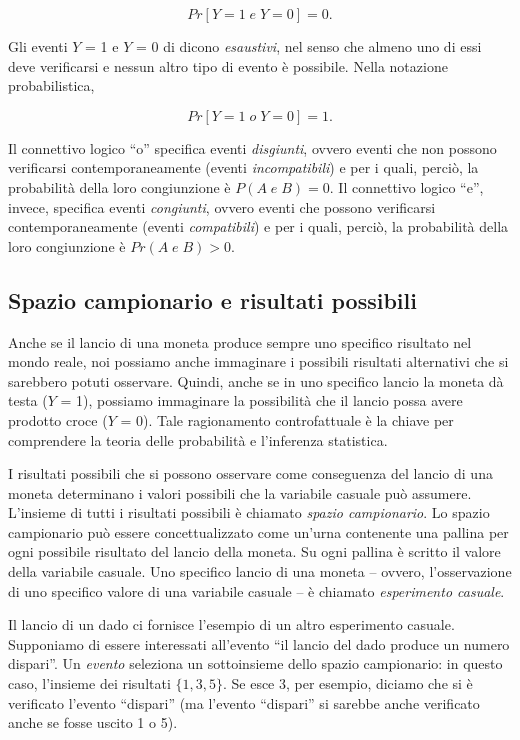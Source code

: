 \documentclass[
  11pt,
]{krantz}
\theoremstyle{definition}
\theoremstyle{definition}
\theoremstyle{definition}
\theoremstyle{definition}
\theoremstyle{remark}
\begin{document}
\[
Pr[Y = 1\; e \; Y = 0] = 0.
\]

Gli eventi \(Y\) = 1 e \(Y\) = 0 di dicono \emph{esaustivi}, nel senso che almeno uno di essi deve verificarsi e nessun altro tipo di evento è possibile. Nella notazione probabilistica,

\[
Pr[Y = 1\; o \; Y = 0] = 1.
\]

Il connettivo logico ``o'' specifica eventi \emph{disgiunti}, ovvero eventi che non possono verificarsi contemporaneamente (eventi \emph{incompatibili}) e per i quali, perciò, la probabilità della loro congiunzione è \(P(A \; e \; B) = 0\). Il connettivo logico ``e'', invece, specifica eventi \emph{congiunti}, ovvero eventi che possono verificarsi contemporaneamente (eventi \emph{compatibili}) e per i quali, perciò, la probabilità della loro congiunzione è \(Pr(A \; e \; B) > 0\).

\hypertarget{spazio-campionario-e-risultati-possibili}{%
\subsection{Spazio campionario e risultati possibili}\label{spazio-campionario-e-risultati-possibili}}

Anche se il lancio di una moneta produce sempre uno specifico risultato nel mondo reale, noi possiamo anche immaginare i possibili risultati alternativi che si sarebbero potuti osservare. Quindi, anche se in uno specifico lancio la moneta dà testa (\(Y\) = 1), possiamo immaginare la possibilità che il lancio possa avere prodotto croce (\(Y\) = 0). Tale ragionamento controfattuale è la chiave per comprendere la teoria delle probabilità e l'inferenza statistica.

I risultati possibili che si possono osservare come conseguenza del lancio di una moneta determinano i valori possibili che la variabile casuale può assumere. L'insieme di tutti i risultati possibili è chiamato \emph{spazio campionario}. Lo spazio campionario può essere concettualizzato come un'urna contenente una pallina per ogni possibile risultato del lancio della moneta. Su ogni pallina è scritto il valore della variabile casuale. Uno specifico lancio di una moneta -- ovvero, l'osservazione di uno specifico valore di una variabile casuale -- è chiamato \emph{esperimento casuale}.

Il lancio di un dado ci fornisce l'esempio di un altro esperimento casuale. Supponiamo di essere interessati all'evento ``il lancio del dado produce un numero dispari''. Un \emph{evento} seleziona un sottoinsieme dello spazio campionario: in questo caso, l'insieme dei risultati \(\{1, 3, 5\}\). Se esce 3, per esempio, diciamo che si è verificato l'evento ``dispari'' (ma l'evento ``dispari'' si sarebbe anche verificato anche se fosse uscito 1 o 5).
\end{document}
